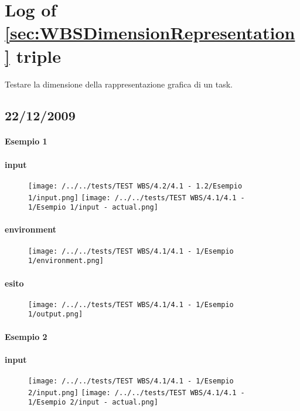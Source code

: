 \section{Log of \ref{sec:WBSDimensionRepresentation} triple}

Testare la dimensione della rappresentazione grafica di un task.

\subsection{22/12/2009}
\paragraph{Esempio 1}
\paragraph{input}
\begin{figure}
\centering
\texttt{[image: /../../tests/TEST WBS/4.2/4.1 - 1.2/Esempio 1/input.png]}
\texttt{[image: /../../tests/TEST WBS/4.1/4.1 - 1/Esempio 1/input - actual.png]}
\end{figure}
\paragraph{environment}
\begin{figure}
\centering
\texttt{[image: /../../tests/TEST WBS/4.1/4.1 - 1/Esempio 1/environment.png]}
\end{figure}
\paragraph{esito}
\begin{figure}
\centering
\texttt{[image: /../../tests/TEST WBS/4.1/4.1 - 1/Esempio 1/output.png]}
\end{figure}

\paragraph{Esempio 2}
\paragraph{input}
\begin{figure}
\centering
\texttt{[image: /../../tests/TEST WBS/4.1/4.1 - 1/Esempio 2/input.png]}
\texttt{[image: /../../tests/TEST WBS/4.1/4.1 - 1/Esempio 2/input - actual.png]}
\end{figure}
